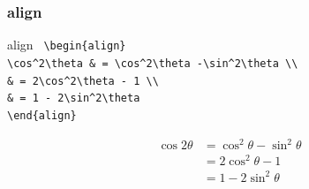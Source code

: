 \subsubsection{align}
\begin{itembox}[c]{align}
  \texttt{
    \hspace{-0.5\zw}\textbackslash begin\{align\}\\
    \hspace{4\zw}\textbackslash cos\textasciicircum2\textbackslash theta \& = \textbackslash cos\textasciicircum2\textbackslash theta -\textbackslash sin\textasciicircum2\textbackslash theta \textbackslash \textbackslash\\
    \hspace{4\zw}\& = 2\textbackslash cos\textasciicircum2\textbackslash theta - 1          \textbackslash \textbackslash\\
    \hspace{4\zw}\& = 1 - 2\textbackslash sin\textasciicircum2\textbackslash theta\\
    \textbackslash end\{align\}
  }
\end{itembox}
\begin{align}
  \cos 2\theta & = \cos^2\theta -\sin^2\theta \\
               & = 2\cos^2\theta - 1          \\
               & = 1 - 2\sin^2\theta
\end{align}

